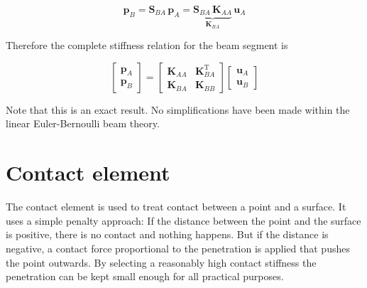 \begin{equation}
\boldsymbol{p}_B = \boldsymbol{S}_{BA}\,\boldsymbol{p}_A =
\underbrace{
\boldsymbol{S}_{BA}\,\boldsymbol{K}_{AA}
}_{\boldsymbol{K}_{BA}}
\,\boldsymbol{u}_A
\end{equation}

Therefore the complete stiffness relation for the beam segment is

\begin{equation}
\begin{bmatrix}
\boldsymbol{p}_A \\ \boldsymbol{p}_B
\end{bmatrix}
=
\begin{bmatrix}
\boldsymbol{K}_{AA} & \boldsymbol{K}_{BA}^\mathrm{T} \\
\boldsymbol{K}_{BA} & \boldsymbol{K}_{BB}
\end{bmatrix}
\begin{bmatrix}
\boldsymbol{u}_A \\ \boldsymbol{u}_B
\end{bmatrix}
\end{equation}

Note that this is an exact result. No simplifications have been made within the linear Euler-Bernoulli beam theory.





































\newpage
\section{Contact element}

The contact element is used to treat contact between a point and a surface. It uses a simple penalty approach: If the distance between the point and the surface is positive, there is no contact and nothing happens. But if the distance is negative, a contact force proportional to the penetration is applied that pushes the point outwards. By selecting a reasonably high contact stiffness the penetration can be kept small enough for all practical purposes.

